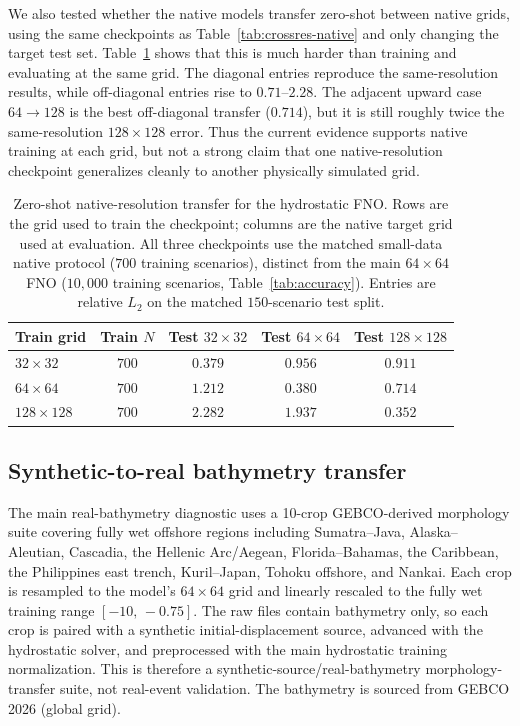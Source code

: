 We also tested whether the native models transfer zero-shot between native grids, using the same checkpoints as Table~\ref{tab:crossres-native} and only changing the target test set. Table~\ref{tab:crossres-native-transfer} shows that this is much harder than training and evaluating at the same grid. The diagonal entries reproduce the same-resolution results, while off-diagonal entries rise to $0.71$--$2.28$. The adjacent upward case $64 \rightarrow 128$ is the best off-diagonal transfer ($0.714$), but it is still roughly twice the same-resolution $128 \times 128$ error. Thus the current evidence supports native training at each grid, but not a strong claim that one native-resolution checkpoint generalizes cleanly to another physically simulated grid.

\begin{table}[H]
\centering
\caption{Zero-shot native-resolution transfer for the hydrostatic FNO. Rows are the grid used to train the checkpoint; columns are the native target grid used at evaluation. All three checkpoints use the matched small-data native protocol ($700$ training scenarios), distinct from the main $64 \times 64$ FNO ($10{,}000$ training scenarios, Table~\ref{tab:accuracy}). Entries are relative $L_2$ on the matched $150$-scenario test split.}
\label{tab:crossres-native-transfer}
\begin{tabular}{lcccc}
    \toprule
    Train grid & Train $N$ & Test $32 \times 32$ & Test $64 \times 64$ & Test $128 \times 128$ \\
    \midrule
    $32 \times 32$   & $700$ & $0.379$ & $0.956$ & $0.911$ \\
    $64 \times 64$   & $700$ & $1.212$ & $0.380$ & $0.714$ \\
    $128 \times 128$ & $700$ & $2.282$ & $1.937$ & $0.352$ \\
    \bottomrule
\end{tabular}
\end{table}

\subsection{Synthetic-to-real bathymetry transfer}
\label{subsec:res-real}

The main real-bathymetry diagnostic uses a 10-crop GEBCO-derived morphology suite covering fully wet offshore regions including Sumatra--Java, Alaska--Aleutian, Cascadia, the Hellenic Arc/Aegean, Florida--Bahamas, the Caribbean, the Philippines east trench, Kuril--Japan, Tohoku offshore, and Nankai. Each crop is resampled to the model's $64 \times 64$ grid and linearly rescaled to the fully wet training range $[-10,\, -0.75]$. The raw files contain bathymetry only, so each crop is paired with a synthetic initial-displacement source, advanced with the hydrostatic solver, and preprocessed with the main hydrostatic training normalization. This is therefore a synthetic-source/real-bathymetry morphology-transfer suite, not real-event validation. The bathymetry is sourced from GEBCO 2026 (global grid).

